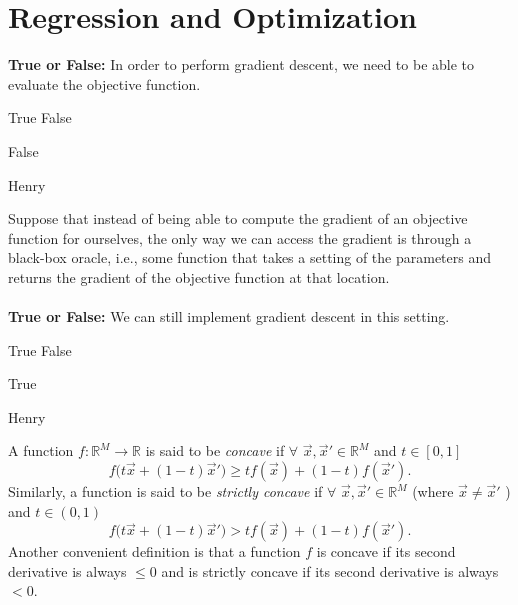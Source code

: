 \section{Regression and Optimization }

\begin{questions}

\question[1] \textbf{True or False:} In order to perform gradient descent, we need to be able to evaluate the objective function.
    \begin{checkboxes}
        \choice True 
        \choice False
    \end{checkboxes}
    \begin{soln}
       False
    \end{soln}
    \begin{qauthor}
        Henry
    \end{qauthor}

\question[1] Suppose that instead of being able to compute the gradient of an objective function for ourselves, the only way we can access the gradient is through a black-box oracle, i.e., some function that takes a setting of the parameters and returns the gradient of the objective function at that location. 
\\
\\
\textbf{True or False:} We can still implement gradient descent in this setting. 
    \begin{checkboxes}
        \choice True 
        \choice False
    \end{checkboxes}
    \begin{soln}
       True
    \end{soln}
    \begin{qauthor}
        Henry
    \end{qauthor}

\begin{EnvFullwidth}

A function $f\colon \mathbb{R}^M \to \mathbb{R}$ is said to be \emph{concave} if $\forall$ $\vec{x}, \vec{x}' \in \mathbb{R}^M$ and $t \in [0,1]$ 
\[
    f\big(t\vec{x}+(1-t)\vec{x}'\big) \ge tf(\vec{x})+(1-t)f(\vec{x}').
\]
Similarly, a function is said to be \emph{strictly concave} if $\forall$ $\vec{x}, \vec{x}' \in \mathbb{R}^M$ (where $\vec{x} \ne \vec{x}'$ ) and $t \in (0,1)$ 
\[
    f\big(t\vec{x}+(1-t)\vec{x}'\big) > tf(\vec{x})+(1-t)f(\vec{x}').
\]
Another convenient definition is that a function $f$ is concave if its second derivative is always $\le 0$ and is strictly concave if its second derivative is always $< 0$. %


\end{EnvFullwidth}
\end{questions}
